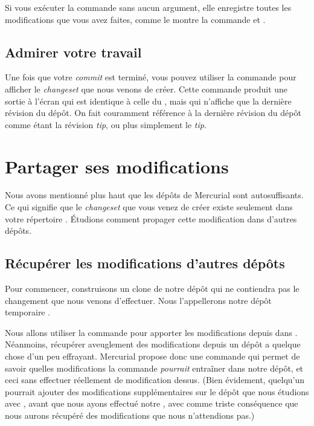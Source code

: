 Si vous exécuter la commande  sans aucun argument, elle
enregistre toutes les modifications que vous avez faites, comme le montre
la commande  et .

\subsection{Admirer votre travail}

Une fois que votre \textit{commit} est terminé, vous pouvez utiliser
la commande  pour afficher le \textit{changeset} que nous
venons de créer. Cette commande produit une sortie à l'écran qui est
identique à celle du , mais qui n'affiche que la dernière
révision du dépôt.
On fait couramment référence à la dernière révision du dépôt comme
étant la révision \textit{tip}, ou plus simplement le \textit{tip}.

\section{Partager ses modifications}

Nous avons mentionné plus haut que les dépôts de Mercurial 
sont autosuffisants. Ce qui signifie que le \textit{changeset} 
que vous venez de créer existe seulement dans votre répertoire 
. Étudions comment propager cette modification
dans d'autres dépôts.

\subsection{Récupérer les modifications d'autres dépôts}
\label{sec:tour:pull}

Pour commencer, construisons un clone de notre dépôt  
qui ne contiendra pas le changement que nous venons d'effectuer. Nous
l'appellerons notre dépôt temporaire .

Nous allons utiliser la commande  pour apporter les 
modifications depuis  dans .
Néanmoins, récupérer aveuglement des modifications depuis un dépôt
a quelque chose d'un peu effrayant. Mercurial propose donc une 
commande  qui permet de savoir quelles modifications
la commande  \emph{pourrait} entraîner dans notre dépôt,
et ceci sans effectuer réellement de modification dessus.
(Bien évidement, quelqu'un pourrait ajouter des modifications
supplémentaires sur le dépôt que nous étudions avec ,
avant que nous ayons effectué notre , avec comme 
triste conséquence que nous aurons récupéré des modifications que 
nous n'attendions pas.)

